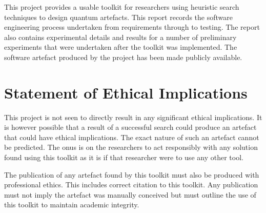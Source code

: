 This project provides a usable toolkit for researchers using heuristic search techniques to design quantum artefacts.
This report records the software engineering process undertaken from requirements through to testing.
The report also contains experimental details and results for a number of preliminary experiments that were undertaken after the toolkit was implemented.
The software artefact produced by the project has been made publicly available.

\section{Statement of Ethical Implications}
This project is not seen to directly result in any significant ethical implications.
It is however possible that a result of a successful search could produce an artefact that could have ethical implications.
The exact nature of such an artefact cannot be predicted.
The onus is on the researchers to act responsibly with any solution found using this toolkit as it is if that researcher were to use any other tool.

The publication of any artefact found by this toolkit must also be produced with professional ethics.
This includes correct citation to this toolkit.
Any publication must not imply the artefact was manually conceived but must outline the use of this toolkit to maintain academic integrity.

